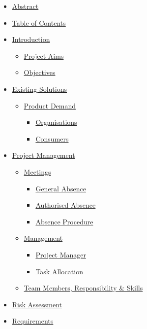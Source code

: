 \documentclass[
  english,
  a4paper,
,tablecaptionabove
]{scrartcl}
\providecommand{\tightlist}{%
  \setlength{\itemsep}{0pt}\setlength{\parskip}{0pt}}
\begin{document}
\begin{itemize}
\tightlist
\item
  \protect\hyperlink{abstract}{Abstract}
\item
  \protect\hyperlink{table-of-contents}{Table of Contents}
\item
  \protect\hyperlink{introduction}{Introduction}

  \begin{itemize}
  \tightlist
  \item
    \protect\hyperlink{project-aims}{Project Aims}
  \item
    \protect\hyperlink{objectives}{Objectives}
  \end{itemize}
\item
  \protect\hyperlink{existing-solutions}{Existing Solutions}

  \begin{itemize}
  \tightlist
  \item
    \protect\hyperlink{product-demand}{Product Demand}

    \begin{itemize}
    \tightlist
    \item
      \protect\hyperlink{organisations}{Organisations}
    \item
      \protect\hyperlink{consumers}{Consumers}
    \end{itemize}
  \end{itemize}
\item
  \protect\hyperlink{project-management}{Project Management}

  \begin{itemize}
  \tightlist
  \item
    \protect\hyperlink{meetings}{Meetings}

    \begin{itemize}
    \tightlist
    \item
      \protect\hyperlink{general-absence}{General Absence}
    \item
      \protect\hyperlink{authorised-absence}{Authorised Absence}
    \item
      \protect\hyperlink{absence-procedure}{Absence Procedure}
    \end{itemize}
  \item
    \protect\hyperlink{management}{Management}

    \begin{itemize}
    \tightlist
    \item
      \protect\hyperlink{project-manager}{Project Manager}
    \item
      \protect\hyperlink{task-allocation}{Task Allocation}
    \end{itemize}
  \item
    \protect\hyperlink{team-members-responsibility--skills}{Team
    Members, Responsibility \& Skills}
  \end{itemize}
\item
  \protect\hyperlink{risk-assessment}{Risk Assessment}
\item
  \protect\hyperlink{requirements}{Requirements}


\end{itemize}
\end{document}
